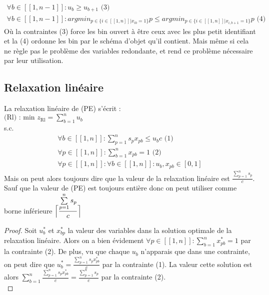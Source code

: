 \documentclass{article}
\begin{document}
\begin{align*}
 \forall b \in [\![ 1 , n-1 ]\!] : u_b \geqslant u_{b+1} \text{ (3)}\\
 \forall b \in [\![ 1 , n-1 ]\!] : argmin_{ p \in \{ i \in [\![ 1 , n ]\!] | x_{ib} = 1 \} } p \leqslant argmin_{ p \in \{ i \in [\![ 1 , n ]\!] | x_{i,b+1} = 1 \} } p \text{ (4)}
\end{align*}
Où la contraintes (3) force les bin ouvert à être ceux avec les plus petit identifiant et la (4) ordonne les bin par le schéma d'objet qu'il contient. Mais même si cela ne règle pas le problème des variables redondante, et rend ce problème nécessaire par leur utilisation.

\subsection{Relaxation linéaire}

La relaxation linéaire de (PE) s'écrit :\\
$\text{(Rl) : min } z_{\text{Rl}} = \sum \limits_{b = 1 }^{n} u_b$\\
s.c.
\begin{align*}
 \forall b \in [\![ 1 , n ]\!] : \sum \limits_{p = 1}^{n} s_p x_{pb} \leqslant u_b c \text{ (1)}\\
 \forall p \in [\![ 1 , n ]\!] : \sum \limits_{b = 1}^{n} x_{pb} = 1 \text{ (2)} \\
 \forall p \in [\![ 1 , n ]\!] : \forall b \in [\![ 1 , n ]\!] : u_b , x_{pb} \in [0,1]
\end{align*}
Mais on peut alors toujours dire que la valeur de la relaxation linéaire est $\frac{\sum \limits_{p = 1}^n s_p}{c}$. Sauf que la valeur de (PE) est toujours entière donc on peut utiliser comme borne inférieure $\Bigl\lceil\dfrac{\sum \limits_{p = 1}^n s_p}{c}\Bigr\rceil\qquad$

\begin{proof}
Soit $u^*_b$ et $x^*_{bp}$ la valeur des variables dans la solution optimale de la relaxation linéaire. Alors on a bien évidement $\forall p \in [\![ 1 , n ]\!] : \sum \limits_{b = 1}^{n} x^*_{pb} = 1$ par la contrainte (2). De plus, vu que chaque $u_b$ n’apparais que dans une contrainte, on peut dire que $u^*_b = \frac{\sum \limits_{p=1}^n s_p x^*_{pb}}{c}$ par la contrainte (1). La valeur cette solution est alors $\sum \limits_{b = 1}^n  \frac{\sum \limits_{p=1}^n s_p x^*_{pb}}{c} = \frac{\sum \limits_{p = 1}^n s_p}{c}$ par la contrainte (2).\\
\end{proof}
\end{document}
